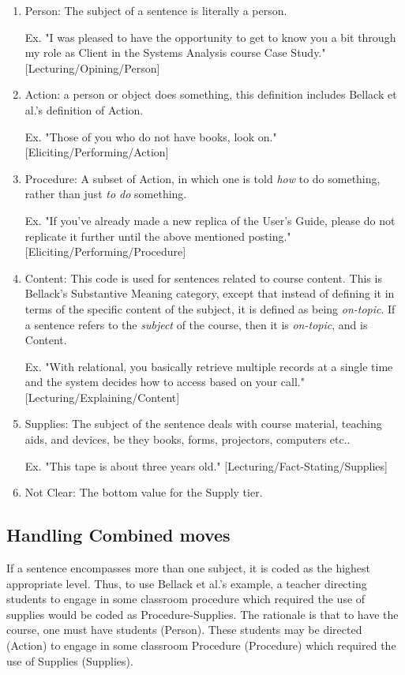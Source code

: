 \documentclass[10pt, letterpaper]{article}
\begin{document}
\begin{enumerate}
\item Person: The subject of a sentence is literally a person.

Ex. "I was pleased to have the opportunity to get to know you a bit
through my role as Client in the Systems Analysis course Case Study."
[Lecturing/Opining/Person]

\item Action: a person or object does something, this definition includes
Bellack et al.'s definition of Action.

Ex. "Those of you who do not have books, look on."
[Eliciting/Performing/Action]

\item Procedure: A subset of Action, in which one is told \emph{how} to do something,
rather than just \emph{to do} something.

Ex. "If you've already made a new replica of the User's Guide, please do
not replicate it further until the above mentioned posting."
[Eliciting/Performing/Procedure]

\item Content: This code is used for sentences related to course content. This
is Bellack's Substantive Meaning category, except that instead of defining
it in terms of the specific content of the subject, it is defined as being
\emph{on-topic}. If a sentence refers to the \emph{subject} of the course, then it
is \emph{on-topic}, and is Content.

Ex. "With relational, you basically retrieve multiple records at a single
time and the system decides how to access based on your call."
[Lecturing/Explaining/Content]

\item Supplies: The subject of the sentence deals with course material, teaching
aids, and devices, be they books, forms, projectors, computers etc..

Ex. "This tape is about three years old." [Lecturing/Fact-Stating/Supplies]

\item Not Clear: The bottom value for the Supply tier.
\end{enumerate}
\subsection*{Handling Combined moves}
\label{sec:org37cc4f5}
If a sentence encompasses more than one subject, it is coded as the highest
appropriate level. Thus, to use Bellack et al.'s example, a teacher directing
students to engage in some classroom procedure which required the use of
supplies would be coded as Procedure-Supplies. The rationale is that to have
the course, one must have students (Person). These students may be directed
(Action) to engage in some classroom Procedure (Procedure) which required the
use of Supplies (Supplies).
\end{document}
